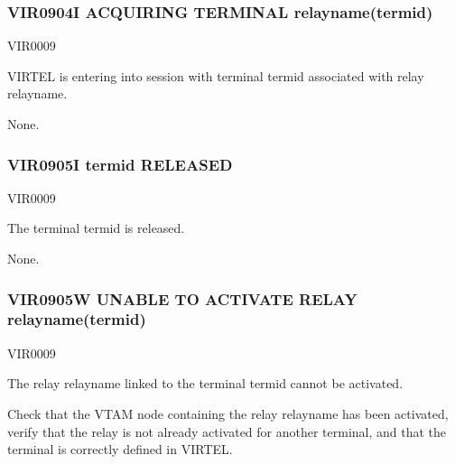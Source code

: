 \documentclass[letterpaper,10pt,english]{sphinxmanual}
\begin{document}
\subsubsection{VIR0904I ACQUIRING TERMINAL relayname(termid)}
\label{\detokenize{messages:vir0904i-acquiring-terminal-relayname-termid}}\begin{description}
\sphinxAtStartPar
VIR0009

\sphinxAtStartPar
VIRTEL is entering into session with terminal termid associated with relay relayname.

\sphinxAtStartPar
None.

\end{description}


\subsubsection{VIR0905I termid RELEASED}
\label{\detokenize{messages:vir0905i-termid-released}}\begin{description}
\sphinxAtStartPar
VIR0009

\sphinxAtStartPar
The terminal termid is released.

\sphinxAtStartPar
None.

\end{description}


\subsubsection{VIR0905W UNABLE TO ACTIVATE RELAY relayname(termid)}
\label{\detokenize{messages:vir0905w-unable-to-activate-relay-relayname-termid}}\begin{description}
\sphinxAtStartPar
VIR0009

\sphinxAtStartPar
The relay relayname linked to the terminal termid cannot be activated.

\sphinxAtStartPar
Check that the VTAM node containing the relay relayname has been activated, verify that the relay is not already activated for another terminal, and that the terminal is correctly defined in VIRTEL.

\end{description}
\end{document}
